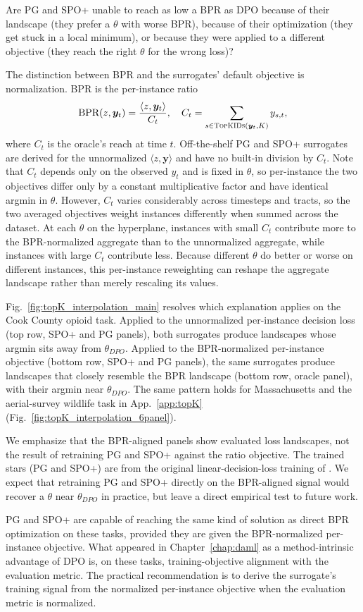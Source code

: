 Are PG and SPO+ unable to reach as low a BPR as DPO because of their landscape (they prefer a $\theta$ with worse BPR), because of their optimization (they get stuck in a local minimum), or because they were applied to a different objective (they reach the right $\theta$ for the wrong loss)?

The distinction between BPR and the surrogates' default objective is normalization. BPR is the per-instance ratio
\begin{align}
\text{BPR}(z, \bm{y}_t) = \frac{\langle z, \bm{y}_t\rangle}{C_t},
\quad C_t = \sum_{s \in \textsc{TopKIDs}(\bm{y}_t, K)} y_{s,t},
\end{align}
where $C_t$ is the oracle's reach at time $t$. Off-the-shelf PG and SPO+ surrogates are derived for the unnormalized $\langle z, \bm{y}\rangle$ and have no built-in division by $C_t$. Note that $C_t$ depends only on the observed $y_t$ and is fixed in $\theta$, so per-instance the two objectives differ only by a constant multiplicative factor and have identical argmin in $\theta$. However, $C_t$ varies considerably across timesteps and tracts, so the two averaged objectives weight instances differently when summed across the dataset. At each $\theta$ on the hyperplane, instances with small $C_t$ contribute more to the BPR-normalized aggregate than to the unnormalized aggregate, while instances with large $C_t$ contribute less. Because different $\theta$ do better or worse on different instances, this per-instance reweighting can reshape the aggregate landscape rather than merely rescaling its values.

Fig.~\ref{fig:topK_interpolation_main} resolves which explanation applies on the Cook County opioid task. Applied to the unnormalized per-instance decision loss (top row, SPO+ and PG panels), both surrogates produce landscapes whose argmin sits away from $\theta_{DPO}$. Applied to the BPR-normalized per-instance objective (bottom row, SPO+ and PG panels), the same surrogates produce landscapes that closely resemble the BPR landscape (bottom row, oracle panel), with their argmin near $\theta_{DPO}$. The same pattern holds for Massachusetts and the aerial-survey wildlife task in App.~\ref{app:topK} (Fig.~\ref{fig:topK_interpolation_6panel}).

We emphasize that the BPR-aligned panels show evaluated loss landscapes, not the result of retraining PG and SPO+ against the ratio objective. The trained stars (PG and SPO+) are from the original linear-decision-loss training of \citet{heuton2025decisionaware}. We expect that retraining PG and SPO+ directly on the BPR-aligned signal would recover a $\theta$ near $\theta_{DPO}$ in practice, but leave a direct empirical test to future work.

PG and SPO+ are capable of reaching the same kind of solution as direct BPR optimization on these tasks, provided they are given the BPR-normalized per-instance objective. What appeared in Chapter~\ref{chap:daml} as a method-intrinsic advantage of DPO is, on these tasks, training-objective alignment with the evaluation metric. The practical recommendation is to derive the surrogate's training signal from the normalized per-instance objective when the evaluation metric is normalized.
